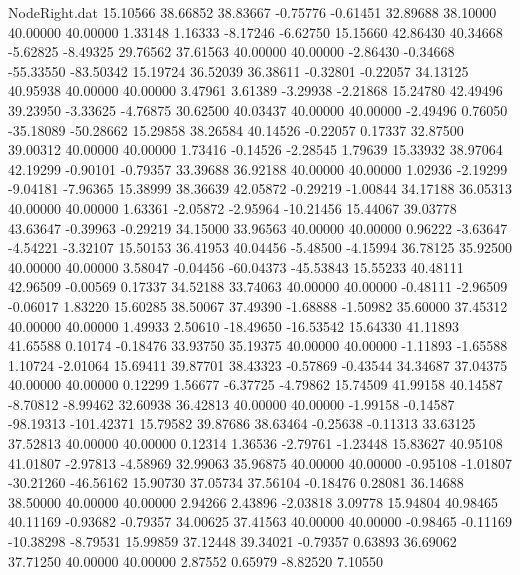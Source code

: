 \begin{filecontents}{NodeRight.dat}
  15.10566   38.66852   38.83667    -0.75776   -0.61451   32.89688   38.10000   40.00000   40.00000    1.33148    1.16333   -8.17246   -6.62750
  15.15660   42.86430   40.34668    -5.62825   -8.49325   29.76562   37.61563   40.00000   40.00000   -2.86430   -0.34668  -55.33550  -83.50342
  15.19724   36.52039   36.38611    -0.32801   -0.22057   34.13125   40.95938   40.00000   40.00000    3.47961    3.61389   -3.29938   -2.21868
  15.24780   42.49496   39.23950    -3.33625   -4.76875   30.62500   40.03437   40.00000   40.00000   -2.49496    0.76050  -35.18089  -50.28662
  15.29858   38.26584   40.14526    -0.22057    0.17337   32.87500   39.00312   40.00000   40.00000    1.73416   -0.14526   -2.28545    1.79639
  15.33932   38.97064   42.19299    -0.90101   -0.79357   33.39688   36.92188   40.00000   40.00000    1.02936   -2.19299   -9.04181   -7.96365
  15.38999   38.36639   42.05872    -0.29219   -1.00844   34.17188   36.05313   40.00000   40.00000    1.63361   -2.05872   -2.95964  -10.21456
  15.44067   39.03778   43.63647    -0.39963   -0.29219   34.15000   33.96563   40.00000   40.00000    0.96222   -3.63647   -4.54221   -3.32107
  15.50153   36.41953   40.04456    -5.48500   -4.15994   36.78125   35.92500   40.00000   40.00000    3.58047   -0.04456  -60.04373  -45.53843
  15.55233   40.48111   42.96509    -0.00569    0.17337   34.52188   33.74063   40.00000   40.00000   -0.48111   -2.96509   -0.06017    1.83220
  15.60285   38.50067   37.49390    -1.68888   -1.50982   35.60000   37.45312   40.00000   40.00000    1.49933    2.50610  -18.49650  -16.53542
  15.64330   41.11893   41.65588     0.10174   -0.18476   33.93750   35.19375   40.00000   40.00000   -1.11893   -1.65588    1.10724   -2.01064
  15.69411   39.87701   38.43323    -0.57869   -0.43544   34.34687   37.04375   40.00000   40.00000    0.12299    1.56677   -6.37725   -4.79862
  15.74509   41.99158   40.14587    -8.70812   -8.99462   32.60938   36.42813   40.00000   40.00000   -1.99158   -0.14587  -98.19313 -101.42371
  15.79582   39.87686   38.63464    -0.25638   -0.11313   33.63125   37.52813   40.00000   40.00000    0.12314    1.36536   -2.79761   -1.23448
  15.83627   40.95108   41.01807    -2.97813   -4.58969   32.99063   35.96875   40.00000   40.00000   -0.95108   -1.01807  -30.21260  -46.56162
  15.90730   37.05734   37.56104    -0.18476    0.28081   36.14688   38.50000   40.00000   40.00000    2.94266    2.43896   -2.03818    3.09778
  15.94804   40.98465   40.11169    -0.93682   -0.79357   34.00625   37.41563   40.00000   40.00000   -0.98465   -0.11169  -10.38298   -8.79531
  15.99859   37.12448   39.34021    -0.79357    0.63893   36.69062   37.71250   40.00000   40.00000    2.87552    0.65979   -8.82520    7.10550

\end{filecontents}

